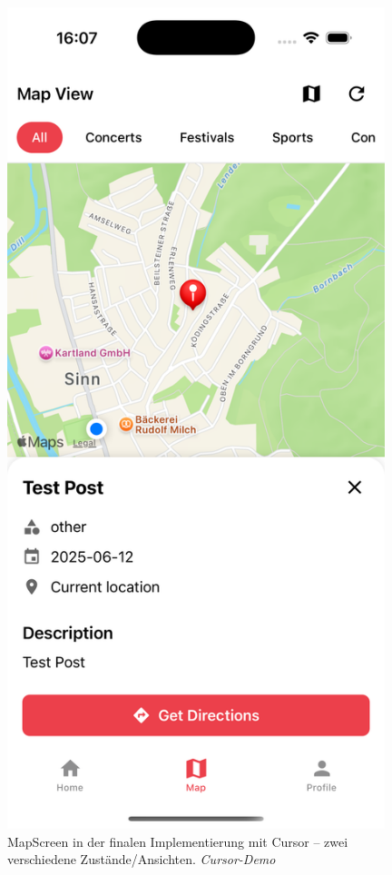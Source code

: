\begin{figure}[htbp]
\begin{minipage}{0.48\textwidth}
      \end{minipage}
      \hfill
      \begin{minipage}{0.48\textwidth}
            \centering
            \includegraphics[width=0.98\textwidth]{images/cursor_screenshots/final-mapscreen-cursor-2.png}
      \end{minipage}
      \caption{MapScreen in der finalen Implementierung mit Cursor – zwei verschiedene Zustände/Ansichten. \textit{Cursor-Demo}}
      \label{fig:cursor-finalpair}
\end{figure}

